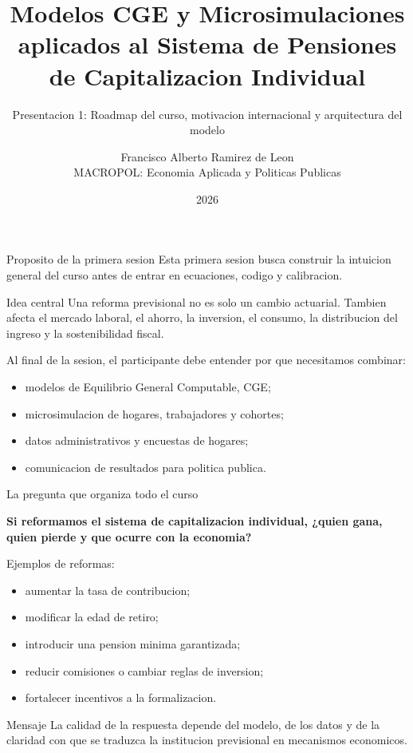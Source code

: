 \documentclass[10pt,aspectratio=169]{beamer}
\title[Curso CGE y Pensiones]{Modelos CGE y Microsimulaciones aplicados al Sistema de Pensiones de Capitalizacion Individual}
\subtitle{Presentacion 1: Roadmap del curso, motivacion internacional y arquitectura del modelo}
\author[MACROPOL]{Francisco Alberto Ramirez de Leon\\MACROPOL: Economia Aplicada y Politicas Publicas}
\date{2026}
\newcommand{\bigquestion}[1]{
\begin{center}
\Large\bfseries\color{macropolblue} #1
\end{center}
}
\begin{document}
\begin{frame}
  \titlepage
\end{frame}

\begin{frame}{Proposito de la primera sesion}
\justifying
Esta primera sesion busca construir la intuicion general del curso antes de entrar en ecuaciones, codigo y calibracion.

\vspace{0.3cm}
\begin{block}{Idea central}
Una reforma previsional no es solo un cambio actuarial. Tambien afecta el mercado laboral, el ahorro, la inversion, el consumo, la distribucion del ingreso y la sostenibilidad fiscal.
\end{block}

\vspace{0.2cm}
Al final de la sesion, el participante debe entender por que necesitamos combinar:
\begin{itemize}
  \item modelos de Equilibrio General Computable, CGE;
  \item microsimulacion de hogares, trabajadores y cohortes;
  \item datos administrativos y encuestas de hogares;
  \item comunicacion de resultados para politica publica.
\end{itemize}
\end{frame}

\begin{frame}{La pregunta que organiza todo el curso}
\bigquestion{Si reformamos el sistema de capitalizacion individual, ¿quien gana, quien pierde y que ocurre con la economia?}

\vspace{0.2cm}
Ejemplos de reformas:
\begin{itemize}
  \item aumentar la tasa de contribucion;
  \item modificar la edad de retiro;
  \item introducir una pension minima garantizada;
  \item reducir comisiones o cambiar reglas de inversion;
  \item fortalecer incentivos a la formalizacion.
\end{itemize}

\vspace{0.3cm}
\begin{alertblock}{Mensaje}
La calidad de la respuesta depende del modelo, de los datos y de la claridad con que se traduzca la institucion previsional en mecanismos economicos.
\end{alertblock}
\end{frame}
\end{document}
